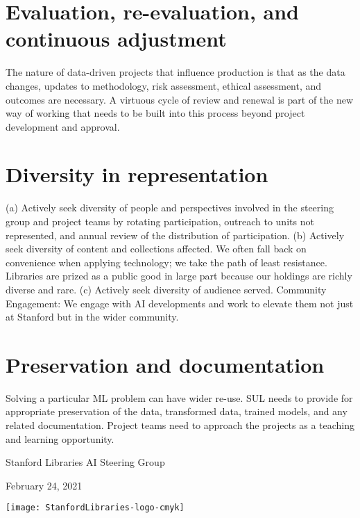 \documentclass[11pt,letterpaper]{article}
\begin{document}
\section*{Evaluation, re-evaluation, and continuous adjustment}
The nature of data-driven projects that influence production is that as the data changes, updates to methodology, risk assessment, ethical assessment, and outcomes are necessary. A virtuous cycle of review and renewal is part of the new way of working that needs to be built into this process beyond project development and approval. 
\section*{Diversity in representation}
 (a) Actively seek diversity of people and perspectives involved in the steering group and project teams by rotating participation, outreach to units not represented, and annual review of the distribution of participation. (b) Actively seek diversity of content and collections affected. We often fall back on convenience when applying technology; we take the path of least resistance. Libraries are prized as a public good in large part because our holdings are richly diverse and rare. (c) Actively seek diversity of audience served. 
Community Engagement: We engage with AI developments and work to elevate them not just at Stanford but in the wider community. 
\section*{Preservation and documentation}
Solving a particular ML problem can have wider re-use. SUL needs to provide for appropriate preservation of the data, transformed data, trained models, and any related documentation. Project teams need to approach the projects as a teaching and learning opportunity.

\begin{flushright}
Stanford Libraries AI Steering Group

February 24, 2021

\texttt{[image: StanfordLibraries-logo-cmyk]}
\end{flushright}
\end{document}
